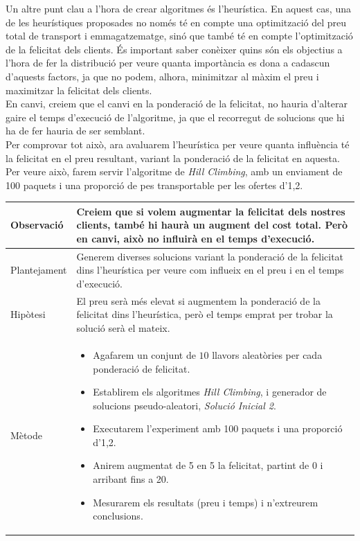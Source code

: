 \documentclass[a4paper]{article}
\begin{document}
	Un altre punt clau a l'hora de crear algoritmes és l'heurística. En aquest cas, una de les heurístiques proposades no només té en compte una optimització del preu total de transport i emmagatzematge, sinó que també té en compte l'optimització de la felicitat dels clients. És important saber conèixer quins són els objectius a l'hora de fer la distribució per veure quanta importància es dona a cadascun d'aquests factors, ja que no podem, alhora, minimitzar al màxim el preu i maximitzar la felicitat dels clients. \\
	
	En canvi, creiem que el canvi en la ponderació de la felicitat, no hauria d'alterar gaire el temps d'execució de l'algoritme, ja que el recorregut de solucions que hi ha de fer hauria de ser semblant. \\
	
	Per comprovar tot això, ara avaluarem l'heurística per veure quanta influència té la felicitat en el preu resultant, variant la ponderació de la felicitat en aquesta. Per veure això, farem servir l'algoritme de \textit{Hill Climbing}, amb un enviament de 100 paquets i una proporció de pes transportable per les ofertes d'1,2. \\
	
	\begin{table}[H]
		\centering
		\begin{tabular}{|l|p{10cm}|}
			\hline
			Observació & Creiem que si volem augmentar la felicitat dels nostres clients, també hi haurà un augment del cost total. Però en canvi, això no influirà en el temps d'execució. \\
			\hline
			Plantejament & Generem diverses solucions variant la ponderació de la felicitat dins l'heurística per veure com influeix en el preu i en el temps d'execució. \\
			\hline
			Hipòtesi & El preu serà més elevat si augmentem la ponderació de la felicitat dins l'heurística, però el temps emprat per trobar la solució serà el mateix. \\
			\hline
			Mètode & 
			\begin{itemize}
				\item Agafarem un conjunt de $10$ llavors aleatòries per cada ponderació de felicitat.
				\item Establirem els algoritmes \textit{Hill Climbing}, i generador de solucions pseudo-aleatori, \textit{Solució Inicial 2}.
				\item Executarem l'experiment amb 100 paquets i una proporció d'1,2.
				\item Anirem augmentat de 5 en 5 la felicitat, partint de 0 i arribant fins a 20.
				\item Mesurarem els resultats (preu i temps) i n'extreurem conclusions.
			\end{itemize} \\
			\hline
		\end{tabular}
		\label{tab:exp6_apartats}
	\end{table}
	
\end{document}

